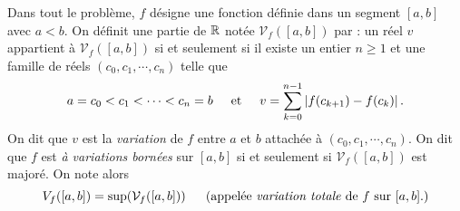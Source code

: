 Dans tout le problème, $f$ désigne une fonction définie dans un segment $[a,b]$ avec  $a < b$. On définit une partie de $\mathbb{R}$ notée $\mathcal{V}_f([a,b])$ par : un réel $v$ appartient à  $\mathcal{V}_f([a,b])$ si et seulement si il existe un entier $n\geq 1$ et une famille de réels $(c_0,c_1, \cdots, c_n)$ telle que
\begin{displaymath}
  a = c_0 < c_1 < \cdots < c_n = b \hspace{0.5cm} \text{et} \hspace{0.5cm} v = \sum_{k=0}^{n-1}\left|f(c_{k+1}) - f(c_k)\right|.
\end{displaymath}
On dit que $v$ est la \emph{variation} de $f$ entre $a$ et $b$ attachée à $(c_0,c_1,\cdots , c_n)$. On dit que $f$ est \emph{à variations bornées} sur $[a,b]$ si et seulement si $\mathcal{V}_f([a,b])$ est majoré. On note alors
\begin{displaymath}
  V_f([a,b]) = \sup (\mathcal{V}_f([a,b]))\hspace{0.5cm} \left( \text{appelée \emph{variation totale} de $f$ sur $[a,b]$.}\right) 
\end{displaymath}

